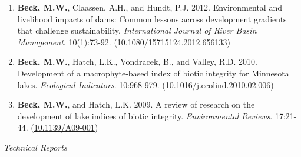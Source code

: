 \documentclass[letterpaper,12pt]{article}
\begin{document}
\begin{enumerate}
\item \textbf{Beck, M.W.}, Claassen, A.H., and Hundt, P.J. 2012. Environmental and livelihood impacts of dams: Common lessons across development gradients that challenge sustainability. \textit{International Journal of River Basin Management}. 10(1):73-92. ({\footnotesize\href{http://dx.doi.org/10.1080/15715124.2012.656133}{10.1080/15715124.2012.656133}})

\item \textbf{Beck, M.W.}, Hatch, L.K., Vondracek, B., and Valley, R.D. 2010. Development of a macrophyte-based index of biotic integrity for Minnesota lakes. \textit{Ecological Indicators}. 10:968-979. ({\footnotesize\href{https://doi.org/10.1016/j.ecolind.2010.02.006}{10.1016/j.ecolind.2010.02.006}})

\item \textbf{Beck, M.W.}, and Hatch, L.K. 2009. A review of research on the development of lake indices of biotic integrity. \textit{Environmental Reviews}. 17:21-44. ({\footnotesize\href{https://doi.org/10.1139/A09-001}{10.1139/A09-001}})

\end{enumerate}

\vspace{\baselineskip} 
\centerline{\large{\textit{Technical Reports}}}
\end{document}

